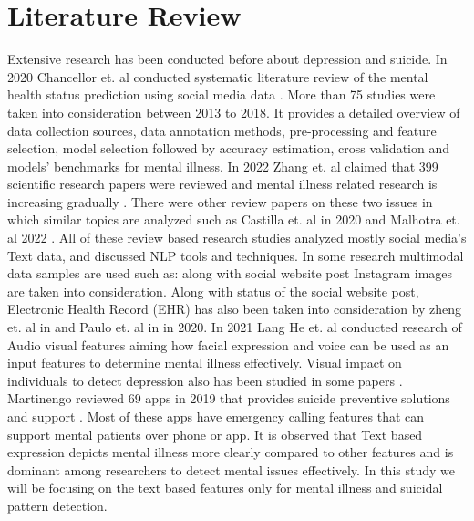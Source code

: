 \documentclass[sn-mathphys,Numbered]{sn-jnl}%
\theoremstyle{thmstyleone}%
\theoremstyle{thmstyletwo}%
\theoremstyle{thmstylethree}%
\begin{document}
\section{Literature Review}
Extensive research has been conducted before about depression and suicide. In 2020 Chancellor et. al conducted systematic literature review of the mental health status prediction using social media data \cite{chancellor2020methods}. More than 75 studies were taken into consideration between 2013 to 2018. It provides a detailed overview of data collection sources, data annotation methods, pre-processing and feature selection, model selection followed by accuracy estimation, cross validation and models’ benchmarks for mental illness. In 2022 Zhang et. al claimed that 399 scientific research papers were reviewed and mental illness related research is increasing gradually \cite{zhang2022natural}. There were other review papers on these two issues in which similar topics are analyzed such as Castilla et. al in 2020 \cite{castillo2020suicide} and Malhotra et. al 2022 \cite{malhotra2022deep}. All of these review based research studies analyzed mostly social media's Text data, and discussed NLP tools and techniques. In some research multimodal data samples are used such as: along with social website post Instagram images are taken into consideration. Along with status of the social website post, Electronic Health Record (EHR) has also been taken into consideration by zheng et. al in \cite{zheng2020development} and Paulo et. al in \cite{mann2020see} in 2020. In 2021 Lang He et. al conducted research of Audio visual features \cite{he2022deep} aiming how facial expression and voice can be used as an input features to determine mental illness effectively. Visual impact on individuals to detect depression also has been studied in some papers \cite{ye2021multi}. Martinengo reviewed 69 apps in 2019 that provides suicide preventive solutions and support \cite{martinengo2019suicide}. Most of these apps have emergency calling features that can support mental patients over phone or app. It is observed that Text based expression depicts mental illness more clearly compared to other features and is dominant among researchers to detect mental issues effectively. In this study we will be focusing on the text based features only for mental illness and suicidal pattern detection. 
\end{document}
